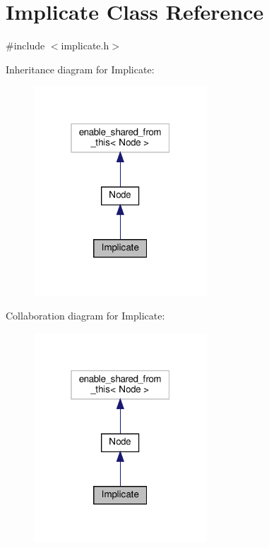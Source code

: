 \hypertarget{class_implicate}{}\section{Implicate Class Reference}
\label{class_implicate}


{\ttfamily \#include $<$implicate.\+h$>$}



Inheritance diagram for Implicate\+:\nopagebreak
\begin{figure}[H]
\begin{center}
\leavevmode
\includegraphics[width=184pt]{db/dcd/class_implicate__inherit__graph}
\end{center}
\end{figure}


Collaboration diagram for Implicate\+:\nopagebreak
\begin{figure}[H]
\begin{center}
\leavevmode
\includegraphics[width=184pt]{d4/d97/class_implicate__coll__graph}
\end{center}
\end{figure}
